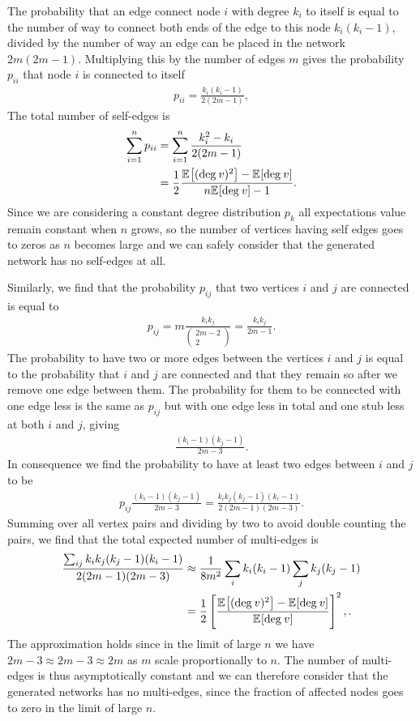 \documentclass[
11pt, %
english, %
singlespacing, %
nolistspacing, %
liststotoc, %
headsepline, %
]{MastersDoctoralThesis} %
\begin{document}
The probability that an edge connect node $i$ with degree $k_i$ to itself is equal to the number of way to connect both ends of the edge to this node $k_i (k_i - 1)$, divided by the number of way an edge can be placed in the network $2 m (2 m - 1)$. Multiplying this by the number of edges $m$ gives the probability $p_{ii}$ that node $i$ is connected to itself
\begin{align}
	p_{ii} = \frac{k_i (k_i - 1)}{2 (2m - 1)},
\end{align}
The total number of self-edges is
\begin{align}
	\sum_{i=1}^n p_{ii} &= \sum_{i=1}^n \frac{k_i^2 - k_i}{2 (2m - 1)} \\
		&= \frac{1}{2} \frac{\mathbb{E}_{}\!\left[ (\mathrm{deg}_{}\, v)^2 \right] - \mathbb{E}_{}\!\left[ \mathrm{deg}_{}\, v \right]}{n \mathbb{E}_{}\!\left[ \mathrm{deg}_{}\, v \right] - 1}.
\end{align}
Since we are considering a constant degree distribution $p_k$ all expectations value remain constant when $n$ grows, so the number of vertices having self edges goes to zeros as $n$ becomes large and we can safely consider that the generated network has no self-edges at all.

Similarly, we find that the probability $p_{ij}$ that two vertices $i$ and $j$ are connected is equal to
\begin{align}
	p_{ij} = m \frac{k_i k_j}{ \begin{pmatrix} 2m - 2 \\ 2 \end{pmatrix} } = \frac{k_i k_j}{2 m -1}.
\end{align}
The probability to have two or more edges between the vertices $i$ and $j$ is equal to the probability that $i$ and $j$ are connected and that they remain so after we remove one edge between them. The probability for them to be connected with one edge less is the same as $p_{ij}$ but with one edge less in total and one stub less at both $i$ and $j$, giving
\begin{align}
	\frac{(k_i - 1)(k_j - 1)}{2 m - 3}.
\end{align}
In consequence we find the probability to have at least two edges between $i$ and $j$ to be
\begin{align}
	p_{ij} \frac{(k_i - 1)(k_j - 1)}{2 m - 3} = \frac{k_i k_j (k_j - 1) (k_i - 1)}{2 (2 m - 1)(2 m - 3)}.
\end{align}
Summing over all vertex pairs and dividing by two to avoid double counting the pairs, we find that the total expected number of multi-edges is
\begin{align}
	\frac{\sum_{ij} k_i k_j (k_j - 1) (k_i - 1)}{2 (2 m - 1)(2 m - 3)}  &\approx \frac{1}{8 m^2} \sum_i k_i(k_i - 1) \sum_j k_j(k_j - 1) \\
	&= \frac{1}{2}\left[ \frac{\mathbb{E}_{}\!\left[ (\mathrm{deg}_{}\, v)^2 \right] - \mathbb{E}_{}\!\left[ \mathrm{deg}_{}\, v \right]}{\mathbb{E}_{}\!\left[ \mathrm{deg}_{}\, v \right]} \right]^2,.
\end{align}
The approximation holds since in the limit of large $n$ we have $2 m - 3 \approx 2 m - 3 \approx 2 m$ as $m$ scale proportionally to $n$. The number of multi-edges is thus asymptotically constant and we can therefore consider that the generated networks has no multi-edges, since the fraction of affected nodes goes to zero in the limit of large $n$.
\end{document}
